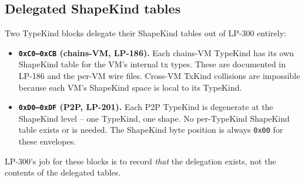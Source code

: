 \subsection{Delegated ShapeKind tables}

Two TypeKind blocks delegate their ShapeKind tables out of LP-300
entirely:

\begin{itemize}[leftmargin=2em,nosep]
\item \textbf{\texttt{0xC0--0xCB} (chains-VM, LP-186).} Each
  chains-VM TypeKind has its own ShapeKind table for the VM's
  internal tx types. These are documented in LP-186 and the per-VM
  wire files. Cross-VM TxKind collisions are impossible because each
  VM's ShapeKind space is local to its TypeKind.
\item \textbf{\texttt{0xD0--0xDF} (P2P, LP-201).} Each P2P TypeKind
  is degenerate at the ShapeKind level -- one TypeKind, one shape.
  No per-TypeKind ShapeKind table exists or is needed. The ShapeKind
  byte position is always \texttt{0x00} for these envelopes.
\end{itemize}

LP-300's job for these blocks is to record \emph{that} the delegation
exists, not the contents of the delegated tables.

